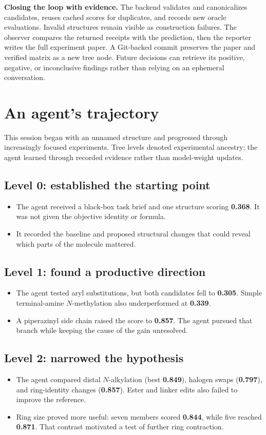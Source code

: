 \documentclass[11pt,a4paper]{article}
\newcommand{\level}[1]{\subsection*{#1}}
\begin{document}
\textbf{Closing the loop with evidence.} The backend validates and canonicalizes candidates, reuses cached scores for duplicates, and records new oracle evaluations. Invalid structures remain visible as construction failures. The observer compares the returned receipts with the prediction, then the reporter writes the full experiment paper. A Git-backed commit preserves the paper and verified matrix as a new tree node. Future decisions can retrieve its positive, negative, or inconclusive findings rather than relying on an ephemeral conversation.

\newpage
\section{An agent's trajectory}
This session began with an unnamed structure and progressed through increasingly focused experiments. Tree levels denoted experimental ancestry; the agent learned through recorded evidence rather than model-weight updates.

\level{Level 0: established the starting point}
\begin{itemize}
\item The agent received a black-box task brief and one structure scoring \textbf{0.368}. It was not given the objective identity or formula.
\item It recorded the baseline and proposed structural changes that could reveal which parts of the molecule mattered.
\end{itemize}

\level{Level 1: found a productive direction}
\begin{itemize}
\item The agent tested aryl substitutions, but both candidates fell to \textbf{0.305}. Simple terminal-amine $N$-methylation also underperformed at \textbf{0.339}.
\item A piperazinyl side chain raised the score to \textbf{0.857}. The agent pursued that branch while keeping the cause of the gain unresolved.
\end{itemize}

\level{Level 2: narrowed the hypothesis}
\begin{itemize}
\item The agent compared distal $N$-alkylation (best \textbf{0.849}), halogen swaps (\textbf{0.797}), and ring-identity changes (\textbf{0.857}). Ester and linker edits also failed to improve the reference.
\item Ring size proved more useful: seven members scored \textbf{0.844}, while five reached \textbf{0.871}. That contrast motivated a test of further ring contraction.
\end{itemize}
\end{document}
